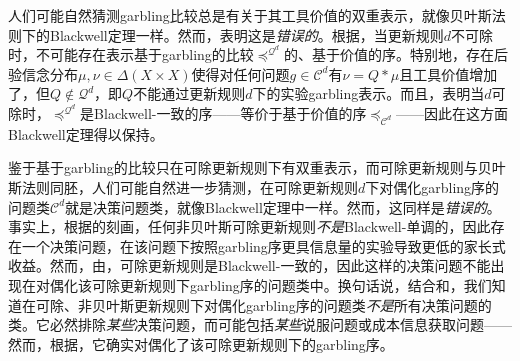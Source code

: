 \documentclass[12pt,letterpaper]{article}
\newenvironment{translation}{\color{blue}}{}
\theoremstyle{plain}
\theoremstyle{definition}
\theoremstyle{remark}
\newcommand{\C}{\mathcal{C}}
\newcommand{\cQ}{\mathcal{Q}}
\theoremstyle{definition}
\begin{document}
\begin{translation}
人们可能自然猜测garbling比较总是有关于其工具价值的双重表示，就像贝叶斯法则下的Blackwell定理一样。然而，表明这是\textit{错误的}。根据，当更新规则$d$不可除时，不可能存在表示基于garbling的比较$\preceq^{\cQ^d}$的、基于价值的序。特别地，存在后验信念分布$\mu,\nu \in \Delta(X \times X)$使得对任何问题$g \in \C^d$有$\nu=Q*\mu$且工具价值增加了，但$Q \not\in \mathcal{Q}^d$，即$Q$不能通过更新规则$d$下的实验garbling表示。而且，表明当$d$可除时，$\preceq^{\cQ^d}$是Blackwell-一致的序——等价于基于价值的序$\preceq_{\C^d}$——因此在这方面Blackwell定理得以保持。

鉴于基于garbling的比较只在可除更新规则下有双重表示，而可除更新规则与贝叶斯法则同胚，人们可能自然进一步猜测，在可除更新规则$d$下对偶化garbling序的问题类$\C^d$就是决策问题类，就像Blackwell定理中一样。然而，这同样是\textit{错误的}。事实上，根据\citet{whitmeyerforthcomingBlackwell}的刻画，任何非贝叶斯可除更新规则\textit{不是}Blackwell-单调的，因此存在一个决策问题，在该问题下按照garbling序更具信息量的实验导致更低的家长式收益。然而，由，可除更新规则是Blackwell-一致的，因此这样的决策问题不能出现在对偶化该可除更新规则下garbling序的问题类中。换句话说，结合\citet{whitmeyerforthcomingBlackwell}和，我们知道在可除、非贝叶斯更新规则下对偶化garbling序的问题类\textit{不是}所有决策问题的类。它必然排除\textit{某些}决策问题，而可能包括\textit{某些}说服问题或成本信息获取问题——然而，根据，它确实对偶化了该可除更新规则下的garbling序。
\end{translation}
\end{document}

